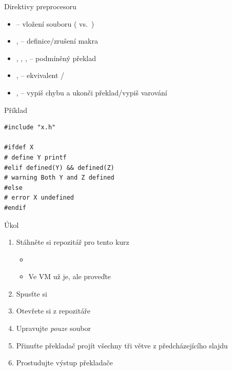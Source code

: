 \begin{frame}[fragile]{Direktivy preprocesoru}

  \begin{itemize}[<+->]
    \item {} -- vložení souboru ( vs.\ )
    \item {},  -- definice/zrušení makra
    \item {}, , ,  -- podmíněný
      překlad
    \item {},  -- ekvivalent
      /
    \item {},  -- vypiš chybu a ukonči překlad/vypiš
      varování
  \end{itemize}

  \begin{block}{Příklad}
    \begin{lstlisting}
#include "x.h"

#ifdef X
# define Y printf
#elif defined(Y) && defined(Z)
# warning Both Y and Z defined
#else
# error X undefined
#endif
    \end{lstlisting}
  \end{block}

\end{frame}

\begin{frame}{Úkol}

  \begin{enumerate}
    \item Stáhněte si repozitář pro tento kurz
    \begin{itemize}
      \item {}
      \item Ve VM už je, ale proveďte 
    \end{itemize}

    \item Spusťte si \qtc
    \item Otevřete si  z repozitáře

    \item Upravujte \emph{pouze} soubor 
    \item Přinuťte překladač projít všechny tři větve z předcházejícího slajdu
    \item Prostudujte výstup překladače
  \end{enumerate}
\end{frame}

